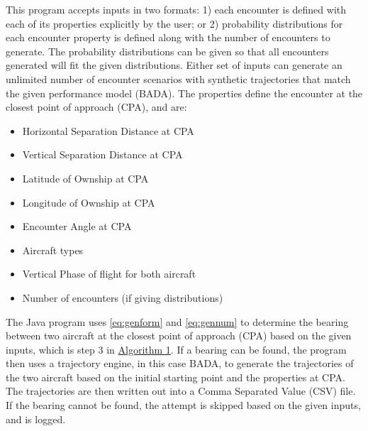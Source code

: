 This program accepts inputs in two formats: 1) each encounter is defined with each of its properties explicitly by the user; or 2) probability distributions for each encounter property is defined along with the number of encounters to generate. The probability distributions can be given so that all encounters generated will fit the given distributions. Either set of inputs can generate an unlimited number of encounter scenarios with synthetic trajectories that match the given performance model (BADA). The properties define the encounter at the closest point of approach (CPA), and are:
\begin{itemize}
    \item Horizontal Separation Distance at CPA
    \item Vertical Separation Distance at CPA
    \item Latitude of Ownship at CPA
    \item Longitude of Ownship at CPA
    \item Encounter Angle at CPA
    \item Aircraft types
    \item Vertical Phase of flight for both aircraft
    \item Number of encounters (if giving distributions)
\end{itemize}
The Java program uses \ref{eq:genform} and \ref{eq:gennum} to determine the bearing between two aircraft at the closest point of approach (CPA) based on the given inputs, which is step 3 in \hyperref[alg:enactrun]{Algorithm 1}. If a bearing can be found, the program then uses a trajectory engine, in this case BADA, to generate the trajectories of the two aircraft based on the initial starting point and the properties at CPA. The trajectories are then written out into a Comma Separated Value (CSV) file. If the bearing cannot be found, the attempt is skipped based on the given inputs, and is logged.